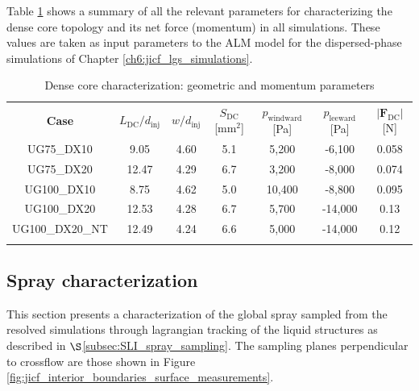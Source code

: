 Table \ref{tab:dense_core_geometry_pressures_and_force_parameters} shows a summary of all the relevant parameters for characterizing the dense core topology and its net force (momentum) in all simulations. These values are taken as input parameters to the ALM model for the dispersed-phase simulations of Chapter \ref{ch6:jicf_lgs_simulations}.


\begin{table}[!h]
\centering
\caption{Dense core characterization: geometric and momentum parameters}
\vspace*{-0.1in}
\begin{tabular}{ccccccc}
\thickhline
\textbf{Case} & $L_\mathrm{DC}/d_\mathrm{inj}$ & $w/d_\mathrm{inj}$ & $S_\mathrm{DC}$ [mm$^2$] & $p_\mathrm{windward}$ [Pa] & $p_\mathrm{leeward}$ [Pa]  & $|\boldsymbol{F}_\mathrm{DC}|$ [N] \\
\thickhline 
UG75\_DX10  & 9.05 & 4.60 & 5.1 & 5,200 & -6,100 & 0.058  \\
UG75\_DX20  & 12.47 & 4.29 & 6.7 & 3,200 & -8,000 &  0.074 \\
UG100\_DX10 & 8.75 & 4.62 & 5.0 & 10,400 & -8,800 & 0.095 \\
UG100\_DX20 & 12.53 & 4.28 & 6.7 & 5,700 & -14,000 & 0.13 \\
UG100\_DX20\_NT & 12.49 & 4.24 & 6.6 & 5,000 & -14,000 & 0.12 \\
\thickhline
\end{tabular}
\label{tab:dense_core_geometry_pressures_and_force_parameters}
\end{table}




\vspace*{-0.05in}

\subsection{Spray characterization}
\label{subsec:ch5_sec_spray_characterization}


This section presents a characterization of the global spray sampled from the resolved simulations through lagrangian tracking of the liquid structures as described in $\S$\ref{subsec:SLI_spray_sampling}. The sampling planes perpendicular to crossflow are those shown in Figure \ref{fig:jicf_interior_boundaries_surface_measurements}.



